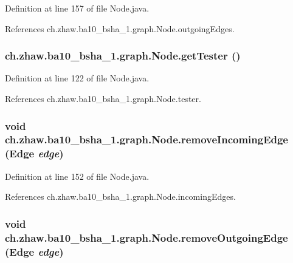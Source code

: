 Definition at line 157 of file Node.java.

References ch.zhaw.ba10\_\-bsha\_\-1.graph.Node.outgoingEdges.\hypertarget{classch_1_1zhaw_1_1ba10__bsha__1_1_1graph_1_1Node_a25060c21d8718f9c9685ed20446e4611}{
\subsubsection[{getTester}]{ ch.zhaw.ba10\_\-bsha\_\-1.graph.Node.getTester ()}}
\label{classch_1_1zhaw_1_1ba10__bsha__1_1_1graph_1_1Node_a25060c21d8718f9c9685ed20446e4611}


Definition at line 122 of file Node.java.

References ch.zhaw.ba10\_\-bsha\_\-1.graph.Node.tester.\hypertarget{classch_1_1zhaw_1_1ba10__bsha__1_1_1graph_1_1Node_aa309007d5babe035612662009aa65471}{
\subsubsection[{removeIncomingEdge}]{\setlength{\rightskip}{0pt plus 5cm}void ch.zhaw.ba10\_\-bsha\_\-1.graph.Node.removeIncomingEdge ({\bf Edge} {\em edge})}}
\label{classch_1_1zhaw_1_1ba10__bsha__1_1_1graph_1_1Node_aa309007d5babe035612662009aa65471}


Definition at line 152 of file Node.java.

References ch.zhaw.ba10\_\-bsha\_\-1.graph.Node.incomingEdges.\hypertarget{classch_1_1zhaw_1_1ba10__bsha__1_1_1graph_1_1Node_ad31d9211d2a1fa2984f02f2faa37c6f1}{
\subsubsection[{removeOutgoingEdge}]{\setlength{\rightskip}{0pt plus 5cm}void ch.zhaw.ba10\_\-bsha\_\-1.graph.Node.removeOutgoingEdge ({\bf Edge} {\em edge})}}
\label{classch_1_1zhaw_1_1ba10__bsha__1_1_1graph_1_1Node_ad31d9211d2a1fa2984f02f2faa37c6f1}


